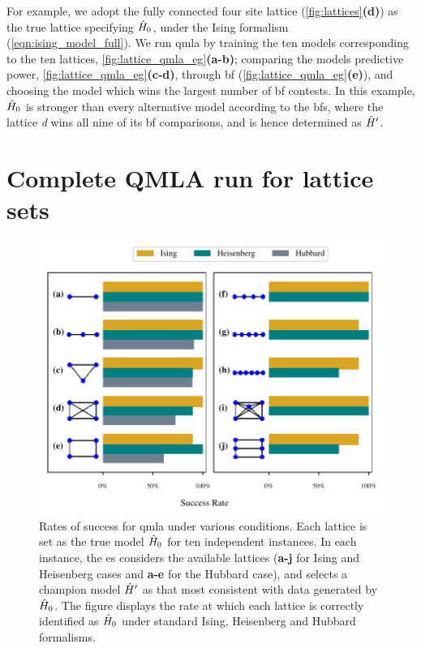 For example, we adopt the fully connected four site lattice (\cref{fig:lattices}\textbf{(d)})
as the true lattice specifying $\hat{H}_0$, under the Ising formalism (\cref{eqn:ising_model_full}).
We run \gls{qmla} by training the ten models corresponding to the ten lattices,  \cref{fig:lattice_qmla_eg}\textbf{(a-b)};
comparing the models predictive power, \cref{fig:lattice_qmla_eg}\textbf{(c-d)},
through \gls{bf} (\cref{fig:lattice_qmla_eg}\textbf{(e)}), 
and choosing the model which wins the largest number of \gls{bf} contests. 
In this example, $\hat{H}_0$ is stronger than every alternative model according to the \glspl{bf},
where the lattice \emph{d} wins all nine of its \gls{bf} comparisons, 
and is hence determined as $\hat{H}^{\prime}$. 

\section{Complete QMLA run for lattice sets}
\begin{figure}
\begin{center}
    \includegraphics{theoretical_study/figures/lattice_successes_two_column.pdf}
\end{center}
\caption[QMLA success rates for lattices]{
    Rates of success for \gls{qmla} under various conditions. 
    Each lattice is set as the \gls{true model} $\hat{H}_0$ for ten independent instances. 
    In each instance, the \gls{es} considers the available lattices 
        (\textbf{a-j} for Ising and Heisenberg cases and \textbf{a-e} for the Hubbard case), 
        and selects a \gls{champion model} $\hat{H}^{\prime}$ as that most consistent with data generated by $\hat{H}_0$. 
    The figure displays the rate at which each lattice is correctly identified as $\hat{H}_0$
        under standard Ising, Heisenberg and Hubbard formalisms. 
    \figtableref
}
\label{fig:lattice_success_rates}
\end{figure}


